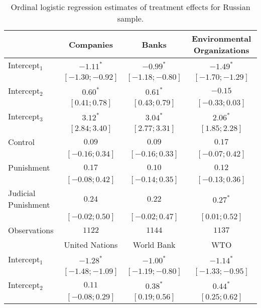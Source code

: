 \begin{table}[h]
\begin{center}
\caption{Ordinal logistic regression estimates of treatment effects for Russian sample.}
\begin{threeparttable}
\begin{tabular}{l c c c}
\hline
 & Companies & Banks & Environmental
Organizations \\
\hline
Intercept$_1$       & $-1.11^{*}$       & $-0.99^{*}$       & $-1.49^{*}$       \\
                    & $ [-1.30; -0.92]$ & $ [-1.18; -0.80]$ & $ [-1.70; -1.29]$ \\
Intercept$_2$       & $0.60^{*}$        & $0.61^{*}$        & $-0.15$           \\
                    & $ [ 0.41;  0.78]$ & $ [ 0.43;  0.79]$ & $ [-0.33;  0.03]$ \\
Intercept$_3$       & $3.12^{*}$        & $3.04^{*}$        & $2.06^{*}$        \\
                    & $ [ 2.84;  3.40]$ & $ [ 2.77;  3.31]$ & $ [ 1.85;  2.28]$ \\
Control             & $0.09$            & $0.09$            & $0.17$            \\
                    & $ [-0.16;  0.34]$ & $ [-0.16;  0.33]$ & $ [-0.07;  0.42]$ \\
Punishment          & $0.17$            & $0.10$            & $0.12$            \\
                    & $ [-0.08;  0.42]$ & $ [-0.14;  0.35]$ & $ [-0.13;  0.36]$ \\
Judicial Punishment & $0.24$            & $0.22$            & $0.27^{*}$        \\
                    & $ [-0.02;  0.50]$ & $ [-0.02;  0.47]$ & $ [ 0.01;  0.52]$ \\
\hline
Observations        & $1122$            & $1144$            & $1137$            \\
\hline
 & United Nations & World Bank & WTO \\
\hline
Intercept$_1$       & $-1.28^{*}$       & $-1.00^{*}$       & $-1.14^{*}$       \\
                    & $ [-1.48; -1.09]$ & $ [-1.19; -0.80]$ & $ [-1.33; -0.95]$ \\
Intercept$_2$       & $0.11$            & $0.38^{*}$        & $0.44^{*}$        \\
                    & $ [-0.08;  0.29]$ & $ [ 0.19;  0.56]$ & $ [ 0.25;  0.62]$ \\

\end{tabular}
\end{threeparttable}
\end{center}
\end{table}
